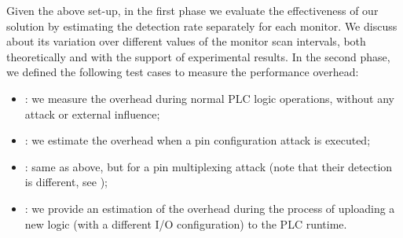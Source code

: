 Given the above set-up, in the first phase we evaluate the effectiveness of our solution by estimating the detection rate separately for each monitor.
We discuss about its variation over different values of the monitor scan intervals, both theoretically and with the support of experimental results.
In the second phase, we defined the following test cases to measure the performance overhead:
\begin{itemize}
	\item {}: we measure the overhead during normal PLC logic operations, without any attack or external influence;
	\item {}: we estimate the overhead when a pin configuration attack is executed;
	\item {}: same as above, but for a pin multiplexing attack (note that their detection is different, see );
	\item {}: we provide an estimation of the overhead during the process of uploading a new logic (with a different I/O configuration) to the PLC runtime.
\end{itemize}

